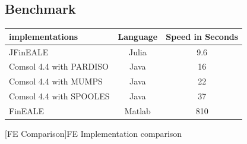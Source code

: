 \begin{appendix}
\section{Benchmark}

\begin{table}[htb]
    \centering
    \begin{tabular}{l|c|c}
        \hline
        implementations         & Language  & Speed in Seconds \\
        \hline
        JFinEALE                & Julia     & 9.6   \\
        Comsol 4.4 with PARDISO & Java      & 16    \\
        Comsol 4.4 with MUMPS   & Java      & 22    \\ 
        Comsol 4.4 with SPOOLES & Java      & 37    \\ 
        FinEALE                 & Matlab    & 810   \\
        \hline
    \end{tabular}
    [FE Comparison]{FE Implementation comparison}
    \label{table:FEComparison}
\end{table}




\end{appendix}
